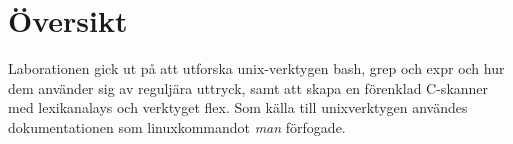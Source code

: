 \section{Översikt}
Laborationen gick ut på att utforska unix-verktygen bash, grep och expr och hur dem använder sig av reguljära uttryck, samt att skapa en förenklad C-skanner med lexikanalays och verktyget flex. 
Som källa till unixverktygen användes dokumentationen som linuxkommandot \emph{man} förfogade.
